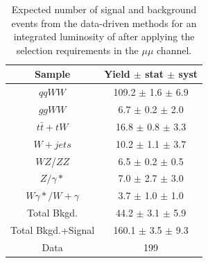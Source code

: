 \begin{table}[ht!]
  \begin{center}
  \begin{tabular} {|c|c|}
\hline
Sample                & Yield $\pm$ stat $\pm$ syst \\ \hline \hline
$qqWW$                & 109.2 $\pm$  1.6 $\pm$  6.9  \\ \hline
$ggWW$                &  6.7 $\pm$  0.2 $\pm$  2.0  \\ \hline
$t\bar{t} + tW$      & 16.8 $\pm$  0.8 $\pm$  3.3  \\ \hline
$W+jets$              & 10.2 $\pm$  1.1 $\pm$  3.7  \\ \hline
$WZ$/$ZZ$             &  6.5 $\pm$  0.2 $\pm$  0.5  \\ \hline
$Z/\gamma*$          &  7.0 $\pm$  2.7 $\pm$  3.0  \\ \hline
$W\gamma*/W+\gamma$ &  3.7 $\pm$  1.0 $\pm$  1.0  \\ \hline \hline
Total Bkgd.           & 44.2 $\pm$  3.1 $\pm$  5.9  \\ \hline \hline
Total Bkgd.+Signal    & 160.1 $\pm$  3.5 $\pm$  9.3  \\ \hline \hline
Data                  & 199 \\ \hline
\end{tabular}
  \caption{Expected number of signal and background events from the data-driven methods for
  an integrated luminosity of \intlumi after applying the selection requirements in the $\mu\mu$ channel.}
   \label{tab:data_yields_mm}
  \end{center}
\end{table}

